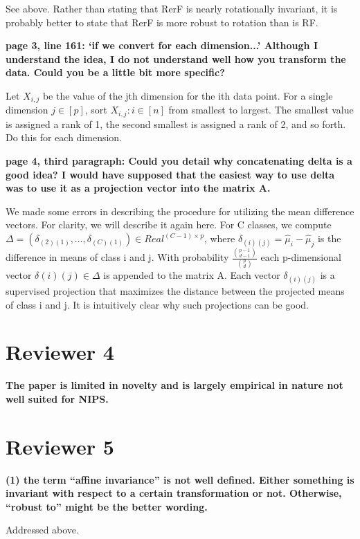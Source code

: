 {See above. Rather than stating that RerF is nearly rotationally invariant, it is probably better to state that RerF is more robust to rotation than is RF.

\textbf{page 3, line 161: `if we convert for each dimension...' Although I understand the idea, I do not understand well how you transform the data. Could you be a little bit more specific?}

Let $X_{i,j}$ be the value of the jth dimension for the ith data point. For a single dimension $j \in [p]$, sort ${X_{i,j}: i \in [n]}$ from smallest to largest. The smallest value is assigned a rank of 1, the second smallest is assigned a rank of 2, and so forth. Do this for each dimension.

\textbf{page 4, third paragraph: Could you detail why concatenating delta is a good idea? I would have supposed that the easiest way to use delta was to use it as a projection vector into the matrix A.}

We made some errors in describing the procedure for utilizing the mean difference vectors. For clarity, we will describe it again here. For C classes, we compute $\Delta = (\delta_{(2)(1)}, \ldots, \delta_{(C)(1)}) \in Real^{(C-1) \times p}$, where $\delta_{(i)(j)} = \hat{\mu}_i - \hat{\mu}_j$ is the difference in means of class i and j. With probability $\frac{\binom{p-1}{d-1}}{\binom{p}{d}}$ each p-dimensional vector $\delta{(i)(j)} \in \Delta$ is appended to the matrix A. Each vector $\delta_{(i)(j)}$ is a supervised projection that maximizes the distance between the projected means of class i and j. It is intuitively clear why such projections can be good.

\section{Reviewer 4}

\textbf{The paper is limited in novelty and is largely empirical in nature not well suited for NIPS.}

\section{Reviewer 5}

\textbf{(1) the term ``affine invariance'' is not well defined. Either something is invariant with respect to a certain transformation or not. Otherwise, ``robust to'' might be the better wording.}

Addressed above.

}
